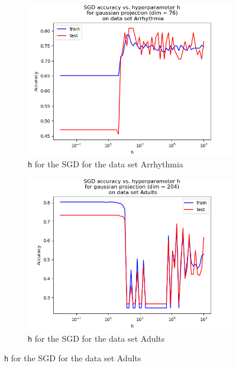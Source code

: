 \documentclass{article}
\begin{document}
\begin{figure}[H]
	\centering
	\begin{subfigure}[t]{0.45\linewidth}
		\includegraphics[width=\linewidth]{SGD_identity_arrhythmia.png}
		\caption{\texttt{h} for the SGD for the data set Arrhythmia}
	\end{subfigure}
	\begin{subfigure}[t]{0.45\linewidth}
		\includegraphics[width=\linewidth]{SGD_identity_adults.png}
		\caption{\texttt{h} for the SGD for the data set Adults}
	\end{subfigure}


\end{figure}
\end{document}
